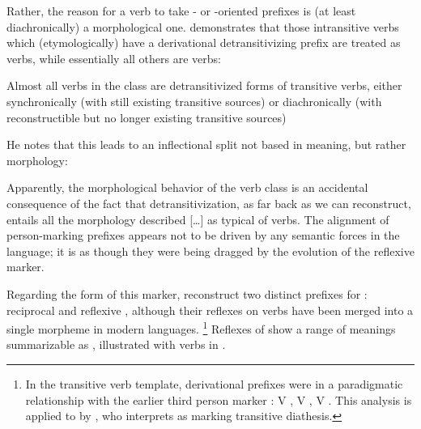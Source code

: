 Rather, the reason for a verb to take - or -oriented prefixes is (at least diachronically) a morphological one.
\textcite[217--221]{meira2000split} demonstrates that those intransitive verbs which (etymologically) have a derivational detransitivizing prefix are treated as  verbs, while essentially all others are  verbs:
\begin{quotebox}{\parencite[201]{meira2000split}}
	Almost all verbs in the  class are detransitivized forms of transitive verbs, either synchronically (with still existing transitive sources) or diachronically (with reconstructible but no longer existing transitive sources)
\end{quotebox}
He notes that this leads to an inflectional split not based in meaning, but rather morphology:

\begin{quotebox}{\parencite[226]{meira2000split}}
	Apparently, the morphological behavior of the  verb class is an accidental consequence of the fact that detransitivization, as far back as we can reconstruct, entails all the morphology described […] as typical of  verbs. The alignment of person-marking prefixes appears not to be driven by any semantic forces in the language; it is as though they were being dragged by the evolution of the reflexive marker.
\end{quotebox}

Regarding the form of this marker, \textcite[505--512]{meira2010origin} reconstruct two distinct prefixes for \PC: reciprocal  and reflexive , although their reflexes on verbs have been merged into a single morpheme in modern languages.%
\footnote{In the \PC transitive verb template, derivational prefixes were in a paradigmatic relationship with the earlier third person marker :
V , V , V .
This analysis is applied to \trio by \textcite[268--269]{triocarlin2004}, who interprets  as marking transitive diathesis.}
Reflexes of \detrz show a range of meanings summarizable as , illustrated with \trio {} verbs in .

